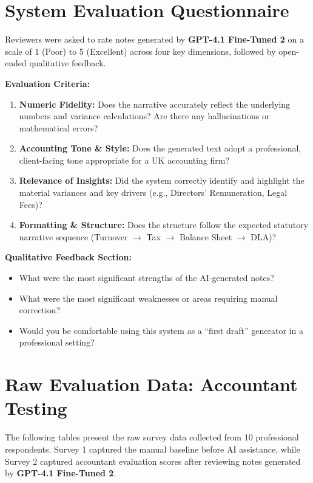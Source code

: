 \clearpage
\section{System Evaluation Questionnaire}
\label{app:sec:questionnaire}

Reviewers were asked to rate notes generated by \textbf{GPT-4.1 Fine-Tuned 2} on a scale of 1 (Poor) to 5 (Excellent) across four key dimensions, followed by open-ended qualitative feedback.

\textbf{Evaluation Criteria:}
\begin{enumerate}
    \item \textbf{Numeric Fidelity:} Does the narrative accurately reflect the underlying numbers and variance calculations? Are there any hallucinations or mathematical errors?
    \item \textbf{Accounting Tone \& Style:} Does the generated text adopt a professional, client-facing tone appropriate for a UK accounting firm?
    \item \textbf{Relevance of Insights:} Did the system correctly identify and highlight the material variances and key drivers (e.g., Directors' Remuneration, Legal Fees)?
    \item \textbf{Formatting \& Structure:} Does the structure follow the expected statutory narrative sequence (Turnover $\rightarrow$ Tax $\rightarrow$ Balance Sheet $\rightarrow$ DLA)?
\end{enumerate}

\textbf{Qualitative Feedback Section:}
\begin{itemize}
    \item What were the most significant strengths of the AI-generated notes?
    \item What were the most significant weaknesses or areas requiring manual correction?
    \item Would you be comfortable using this system as a ``first draft'' generator in a professional setting?
\end{itemize}

\clearpage
\section{Raw Evaluation Data: Accountant Testing}
\label{app:sec:raw_data}

The following tables present the raw survey data collected from 10 professional respondents. Survey 1 captured the manual baseline before AI assistance, while Survey 2 captured accountant evaluation scores after reviewing notes generated by \textbf{GPT-4.1 Fine-Tuned 2}.

